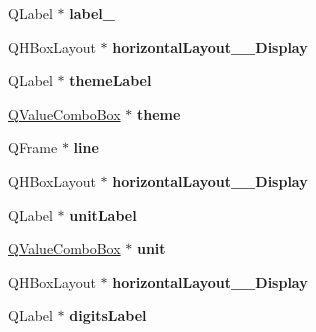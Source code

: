 \begin{DoxyCompactItemize}
\item 
\mbox{\label{class_ui___options_dialog_a38373b6c65de0ab1c710f75fcb137256}} 
Q\+Label $\ast$ {\bfseries label\+\_}
\item 
\mbox{\label{class_ui___options_dialog_ae0a30c268123f9eb3223c06712045b5e}} 
Q\+H\+Box\+Layout $\ast$ {\bfseries horizontal\+Layout\+\_\+\_\+\+Display}
\item 
\mbox{\label{class_ui___options_dialog_a9b0b8fe7db715bb0c3dead8667914d8b}} 
Q\+Label $\ast$ {\bfseries theme\+Label}
\item 
\mbox{\label{class_ui___options_dialog_a410cd630ce65ade68009811d0cc090e6}} 
\mbox{\hyperlink{class_q_value_combo_box}{Q\+Value\+Combo\+Box}} $\ast$ {\bfseries theme}
\item 
\mbox{\label{class_ui___options_dialog_a80c20f3e903de3f17e0f02b1f65b4138}} 
Q\+Frame $\ast$ {\bfseries line}
\item 
\mbox{\label{class_ui___options_dialog_a42fdc83ad16a8c5747fb3a522aa753ed}} 
Q\+H\+Box\+Layout $\ast$ {\bfseries horizontal\+Layout\+\_\+\_\+\+Display}
\item 
\mbox{\label{class_ui___options_dialog_a55774426bda17e83e5fd45cbfa188144}} 
Q\+Label $\ast$ {\bfseries unit\+Label}
\item 
\mbox{\label{class_ui___options_dialog_a88bab84485d48a9aa5ac2f0263c4bd13}} 
\mbox{\hyperlink{class_q_value_combo_box}{Q\+Value\+Combo\+Box}} $\ast$ {\bfseries unit}
\item 
\mbox{\label{class_ui___options_dialog_ad1c9a3e376e2e6e9b82712ee9bb22d6e}} 
Q\+H\+Box\+Layout $\ast$ {\bfseries horizontal\+Layout\+\_\+\_\+\+Display}
\item 
\mbox{\label{class_ui___options_dialog_ac1df026c299f11fcb92ea9a209609bc5}} 
Q\+Label $\ast$ {\bfseries digits\+Label}
\item 

\end{DoxyCompactItemize}
